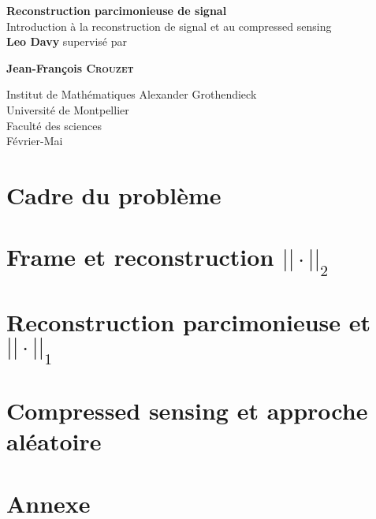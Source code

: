 \documentclass[12pt]{report}
\theoremstyle{plain}
\theoremstyle{remark}
\theoremstyle{definition}
\begin{document}
\renewcommand{\proofname}{Preuve}
\begin{titlepage}
	\begin{center}
		\vspace*{1cm}
		\huge
		\textbf{Reconstruction parcimonieuse de signal\\}
		\vspace*{0.5cm}
	        \LARGE
		Introduction à la reconstruction de signal et au compressed sensing\\ 
		\vspace{1.5cm}
		\textbf{Leo Davy}
		\vfill				      
	        supervisé par\par
		\textbf{Jean-François \textsc{Crouzet}}
							    
		\vspace{0.8cm}
		
		\Large					  
		Institut de Mathématiques Alexander Grothendieck\\
		Université de Montpellier\\
	        Faculté des sciences\\
	        Février-Mai
				      
	\end{center}
\end{titlepage}


\tableofcontents{}

\chapter{Cadre du problème}


\chapter{Frame et reconstruction $||\cdot||_2$}


\chapter{Reconstruction parcimonieuse et $||\cdot||_1$}


\chapter{Compressed sensing et approche aléatoire}


%

\appendix

\chapter{Annexe}


\printbibliography
\end{document}

